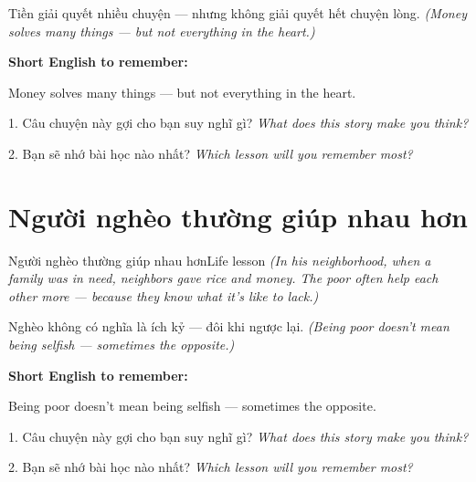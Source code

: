\begin{baihoc}
Tiền giải quyết nhiều chuyện — nhưng không giải quyết hết chuyện lòng.
\textit{(Money solves many things — but not everything in the heart.)}
\end{baihoc}

\begin{ghinhoanh}
\textbf{Short English to remember:}

Money solves many things — but not everything in the heart.

\end{ghinhoanh}

\begin{tuhocnhanh}
1. Câu chuyện này gợi cho bạn suy nghĩ gì? \textit{What does this story make you think?}

2. Bạn sẽ nhớ bài học nào nhất? \textit{Which lesson will you remember most?}
\end{tuhocnhanh}
\ngancach


\section{Người nghèo thường giúp nhau hơn}
\begin{truyen}{Người nghèo thường giúp nhau hơn}{Life lesson}
\textit{(In his neighborhood, when a family was in need, neighbors gave rice and money. The poor often help each other more — because they know what it's like to lack.)}
\end{truyen}

\begin{baihoc}
Nghèo không có nghĩa là ích kỷ — đôi khi ngược lại.
\textit{(Being poor doesn't mean being selfish — sometimes the opposite.)}
\end{baihoc}

\begin{ghinhoanh}
\textbf{Short English to remember:}

Being poor doesn't mean being selfish — sometimes the opposite.

\end{ghinhoanh}

\begin{tuhocnhanh}
1. Câu chuyện này gợi cho bạn suy nghĩ gì? \textit{What does this story make you think?}

2. Bạn sẽ nhớ bài học nào nhất? \textit{Which lesson will you remember most?}
\end{tuhocnhanh}
\ngancach


